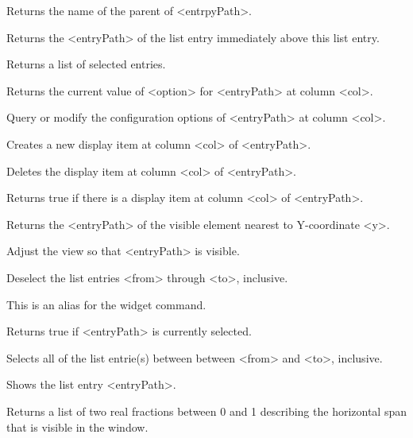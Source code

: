 \begin{enum}{1cm}
Returns the name of the parent of <entrpyPath>.

Returns the <entryPath> of the list entry immediately above this list entry.

Returns a list of selected entries.

Returns the current value of <option> for <entryPath> at column <col>.

Query or modify the configuration options of <entryPath> at column <col>.

Creates a new display item at column <col> of <entryPath>.

Deletes the display item at column <col> of <entryPath>.

Returns true if there is a display item at column <col> of <entryPath>.

Returns the <entryPath> of the visible element nearest to Y-coordinate <y>.

Adjust the view so that <entryPath> is visible.

Deselect the list entries <from> through <to>, inclusive.

This is an alias for the  widget command.

Returns true if <entryPath> is currently selected.

Selects all of the list entrie(s) between between <from> and <to>, inclusive.

Shows the list entry <entryPath>. 

Returns a list of two real fractions between 0 and 1 describing the horizontal span that is visible in the window.


\end{enum}
